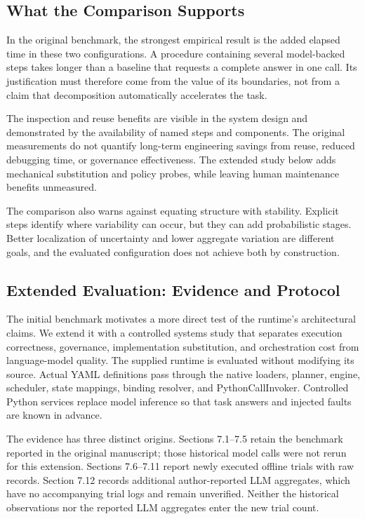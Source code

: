 \documentclass[10pt,twocolumn,a4paper]{article}
\begin{document}
\subsection{What the Comparison Supports}

In the original benchmark, the strongest empirical result is the added elapsed time in these two configurations. A procedure containing several model-backed steps takes longer than a baseline that requests a complete answer in one call. Its justification must therefore come from the value of its boundaries, not from a claim that decomposition automatically accelerates the task.


The inspection and reuse benefits are visible in the system design and demonstrated by the availability of named steps and components. The original measurements do not quantify long-term engineering savings from reuse, reduced debugging time, or governance effectiveness. The extended study below adds mechanical substitution and policy probes, while leaving human maintenance benefits unmeasured.


The comparison also warns against equating structure with stability. Explicit steps identify where variability can occur, but they can add probabilistic stages. Better localization of uncertainty and lower aggregate variation are different goals, and the evaluated configuration does not achieve both by construction.


\subsection{Extended Evaluation: Evidence and Protocol}

The initial benchmark motivates a more direct test of the runtime's architectural claims. We extend it with a controlled systems study that separates execution correctness, governance, implementation substitution, and orchestration cost from language-model quality. The supplied runtime is evaluated without modifying its source. Actual YAML definitions pass through the native loaders, planner, engine, scheduler, state mappings, binding resolver, and PythonCallInvoker. Controlled Python services replace model inference so that task answers and injected faults are known in advance.


The evidence has three distinct origins. Sections 7.1--7.5 retain the benchmark reported in the original manuscript; those historical model calls were not rerun for this extension. Sections 7.6--7.11 report newly executed offline trials with raw records. Section 7.12 records additional author-reported LLM aggregates, which have no accompanying trial logs and remain unverified. Neither the historical observations nor the reported LLM aggregates enter the new trial count.
\end{document}

